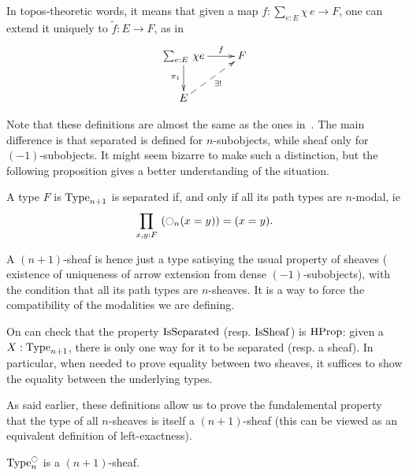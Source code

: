 In topos-theoretic words, it means that given a map $f : \sum_{e:E}
\chi\, e\to F$, one can
extend it uniquely to $\tilde f:E \to F$, as in 
 \[ \xymatrix{
    \sumD e E {\chi e} \ar[r]^-f \ar[d]_{\pi_1} & F \\
    E \ar@{-->}[ru]_{\exists !}&
  }\]

Note that these definitions are almost the same as the ones
in~\cite{maclanemoerdijk}. The main difference is that {separated}
is defined for $n$-subobjects, while {sheaf} only for
$(-1)$-subobjects. It might seem bizarre to make such a distinction,
but the following proposition gives a better understanding of the situation.
\begin{prop}
  A type $F$ is $\operatorname{Type}_{n+1}$ is separated if, and only if all its
  path types are $n$-modal, ie
  \[ \prod_{x,y:F}\, \left( \ocircle_n(x=y) \right) = (x=y).\]
\end{prop}

A $(n+1)$-sheaf is hence just a type satisying the usual property of sheaves
(\ie{} existence of uniqueness of arrow extension from dense
$(-1)$-subobjects), with the condition that all its path types are
$n$-sheaves. It is a way to force the compatibility of the modalities we
are defining.


On can check that the property $\operatorname{IsSeparated}$ (resp. $\operatorname{IsSheaf}$) is $\operatorname{HProp}$:
given a $X:\operatorname{Type}_{n+1}$, there is only one way for it to be separated
(resp. a sheaf). In particular, when needed to prove equality between
two sheaves, it suffices to show the equality between the underlying
types.


As said earlier, these definitions allow us to prove the fundalemental
property that the type of all $n$-sheaves is itself a $(n+1)$-sheaf
(this can be viewed as an equivalent definition of left-exactness).

\begin{prop}\label{prop:sheaf-is-sheaf}
  $\operatorname{Type}_n^{\ocircle}$ is a $(n+1)$-sheaf.
\end{prop}

